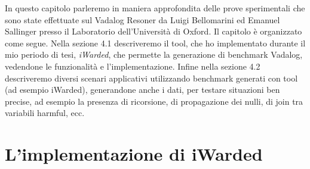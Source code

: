 In questo capitolo parleremo in maniera approfondita delle prove sperimentali che sono state effettuate sul Vadalog Resoner da Luigi Bellomarini ed Emanuel Sallinger presso il Laboratorio dell'Università di Oxford. \newline
Il capitolo è organizzato come segue. Nella sezione 4.1 descriveremo il tool, che ho implementato durante il mio periodo di tesi, \emph{iWarded}, che permette la generazione di benchmark Vadalog, vedendone le funzionalità e l'implementazione. \newline
Infine nella sezione 4.2 descriveremo diversi scenari applicativi utilizzando benchmark generati con tool (ad esempio iWarded), generandone anche i dati, per testare situazioni ben precise, ad esempio la presenza di ricorsione, di propagazione dei nulli, di join tra variabili harmful, ecc.

\section{L'implementazione di iWarded}

